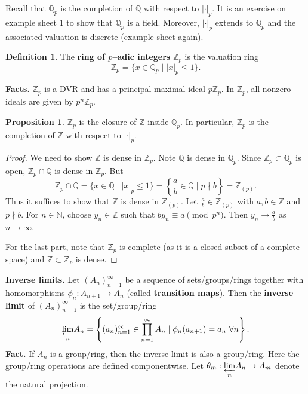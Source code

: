 \documentclass{article}
\theoremstyle{definition}
\newtheorem{prop}[theorem]{Proposition}
\newtheorem{defn}{Definition}[section]
\begin{document}
Recall that $\mathbb{Q}_p$ is the completion of $\mathbb{Q}$ with respect to $|\cdot|_p$. It is an exercise on example sheet 1 to show that $\mathbb{Q}_p$ is a field. Moreover, $|\cdot|_p$ extends to $\mathbb{Q}_p$ and the associated valuation is discrete (example sheet again).
\begin{defn}
    The \textbf{ring of $p$--adic integers} $\mathbb{Z}_p$ is the valuation ring  \[
    \mathbb{Z}_p = \{x \in \mathbb{Q}_p \mid |x|_p \le 1\}.
    \]
\end{defn}
\textbf{Facts.} $\mathbb{Z}_p$ is a DVR and has a principal maximal ideal $p\mathbb{Z}_p$. In $\mathbb{Z}_p$, all nonzero ideals are given by $p^n \mathbb{Z}_p$. 
\begin{prop}
    $\mathbb{Z}_p$ is the closure of $\mathbb{Z}$ inside $\mathbb{Q}_p$. In particular, $\mathbb{Z}_p$ is the completion of $\mathbb{Z}$ with respect to $|\cdot|_p$.
\end{prop}
\begin{proof}
    We need to show $\mathbb{Z}$ is dense in $\mathbb{Z}_p$. Note $\mathbb{Q}$ is dense in $\mathbb{Q}_p$. Since $\mathbb{Z}_p \subset \mathbb{Q}_p$ is open, $\mathbb{Z}_p \cap \mathbb{Q}$ is dense in $\mathbb{Z}_p$. But $$\mathbb{Z}_p \cap \mathbb{Q} = \{x \in \mathbb{Q}\mid |x|_p \le 1\} = \left\{\frac{a}{b} \in \mathbb{Q} \mid  p \nmid b\right\} = \mathbb{Z}_{(p)}.$$
    Thus it suffices to show that $\mathbb{Z}$ is dense in $\mathbb{Z}_{(p)}$. Let $\frac{a}{b} \in \mathbb{Z}_{(p)}$ with $a,b \in \mathbb{Z}$ and $p \nmid b$. For $n \in \mathbb{N}$, choose $y_n \in \mathbb{Z}$ such that $by_n \equiv a \pmod{p^n}$. Then $y_n \to \frac{a}{b}$ as $n \to \infty$. 
    \vspace{1mm}
     
    For the last part, note that $\mathbb{Z}_p$ is complete (as it is a closed subset of a complete space) and $\mathbb{Z} \subset \mathbb{Z}_p$ is dense.
\end{proof}

\textbf{Inverse limits.} Let $(A_n)_{n=1}^\infty$ be a sequence of sets/groups/rings together with homomorphisms $\phi_n : A_{n+1} \to A_n$ (called \textbf{transition maps}). Then the \textbf{inverse limit} of $(A_n)_{n=1}^\infty$ is the set/group/ring \[
\underset{n}{\varprojlim} A_n = \left\{(a_n)_{n=1}^\infty \in \prod_{n=1}^{\infty} A_n \mid \phi_n(a_{n+1}) = a_n ~\forall n\right\}. 
\]
\textbf{Fact.} If $A_n$ is a group/ring, then the inverse limit is also a group/ring. Here the group/ring operations are defined componentwise. Let $\theta_m : \underset{n}{\varprojlim} A_n \to A_m$ denote the natural projection.
\vspace{1mm}
 
\end{document}

